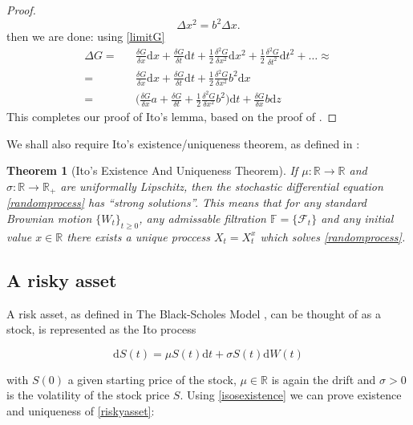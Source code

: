 \documentclass[11pt]{article} %
\newtheorem{theorem}{Theorem}[section]
\begin{document}
\begin{proof}
$$\Delta x^2 = b^2\Delta x.$$ 
 then we are done: using \eqref{limitG} 
\begin{align}
    \Delta G =&& \frac{\delta G}{\delta x} \mathrm{d} x + 
    \frac{\delta G}{\delta t} \mathrm{d} t + 
    \frac{1}{2} \frac{\delta^2 G}{\delta x^2} \mathrm{d} x^2 + 
    \frac{1}{2} \frac{\delta^2 G}{\delta t^2} \mathrm{d} t^2 + \dots \approx \\
    =&& \frac{\delta G}{\delta x} \mathrm{d} x + 
    \frac{\delta G}{\delta t} \mathrm{d} t + 
    \frac{1}{2} \frac{\delta^2 G}{\delta x^2} b^2 \mathrm{d} x\\
    =&& \bigg(\frac{\delta G}{\delta x}a+ \frac{\delta G}{\delta t} + \frac{1}{2} 
    \frac{\delta^2 G}{\delta x^2} b^2 \bigg)\mathrm{d}t + \frac{\delta G}{\delta x} 
    b \mathrm{d}z
\end{align}
This completes our proof of Ito's lemma, based on the proof of 
\cite{optionsderivatives}.
\end{proof}

We shall also require Ito's existence/uniqueness theorem, as defined in 
\cite{SDE}:

\begin{theorem}[Ito's Existence And Uniqueness Theorem] 
    \label{isosexistence}
    If $\mu : \mathbb{R} \to \mathbb{R}$ and $\sigma : \mathbb{R} \to \mathbb{R}_+$ 
    are uniformally Lipschitz, then the stochastic differential equation 
    \eqref{randomprocess} has ``strong solutions''. This means that for any standard 
    Brownian motion $\{W_t\}_{t\geq0}$, any admissable filtration $\mathbb{F} = 
    \{\mathcal{F}_t\}$ and any initial value $x \in \mathbb{R}$ there exists a 
    unique proccess $X_t = X_t^x$ which solves \eqref{randomprocess}. 

    
\end{theorem}
\subsection{A risky asset}

A risk asset, as defined in The Black-Scholes Model \cite{blackscholes}, 
can be thought of as a stock, is represented as the Ito process

\begin{equation} \label{riskyasset}
    \mathrm{d}S(t) = \mu S(t)\mathrm{d}t + \sigma S(t) \mathrm{d}W(t)
\end{equation}

with $S(0)$ a given starting price of the stock, $\mu \in \mathbb{R}$ 
is again the drift and $\sigma > 0$ is the volatility of the stock 
price $S$. Using \eqref{isosexistence} we can prove existence and uniqueness of 
\eqref{riskyasset}:
\end{document}
